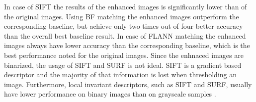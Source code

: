 \documentclass[draft,final]{vutinfth} %
\begin{document}
In case of SIFT the results of the enhanced images is significantly lower than of the original images.
Using BF matching the enhanced images outperform the corresponding baseline, but achieve only two times out of four better accuracy than the overall best baseline result.
In case of FLANN matching the enhanced images always have lower accuracy than the corresponding baseline, which is the best performance noted for the original images. 
Since the enhnaced images are binarized, the usage of SIFT and SURF is not ideal.
SIFT is a gradient based descriptor and the majority of that information is lost when thresholding an image.
Furthermore, local invariant descriptors, such as SIFT and SURF, usually have lower performance on binary images than on grayscale samples \cite{wang2017manifold}.

\end{document}
